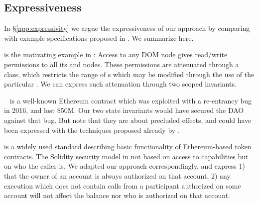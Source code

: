 \newcommand{\paragraphSDD}[1]{\vspace{.01cm}{\textit{#1}}}

\subsection{Expressiveness} 

In   \S \ref{app:expressivity} we argue the expressiveness of our approach by comparing with example specifications  proposed in \cite{OOPSLA22,dd,VerX}.
We   summarize here.

 

\paragraphSDD{DOM} is the motivating example  in \cite{dd}: Access to any DOM node
gives read/write  permissions to  all its  and  nodes. 
These permissions are attenuated   through a  class, %
 which restricts the range of s which may be modified through the use of the particular . 
We can express such  attenuation   through two scoped invariants.

\paragraphSDD{DAO} %
 ~\cite{Dao}  is a well-known Ethereum contract   which was exploited with a re-entrancy bug in 2016, 
and lost \$50M. 
Our two state invariants  would have secured the DAO against that bug. %
But note  that they are about precluded effects, and 
 could have been expressed with the techniques proposed already by \cite{MeyerDBC92}.
 
 \paragraphSDD{ERC20} is a widely used %
 standard describing  basic functionality of Ethereum-based token 
contracts. 
The Solidity security model in not based on access to  capabilities but on who the caller  is. 
We  adapted our approach correspondingly, and 
%
express 1) that  the owner of an account is always authorized on that account,  2) any execution which does not contain calls from a participant  authorized on some account will not affect the balance nor  who is authorized on  that account. 
